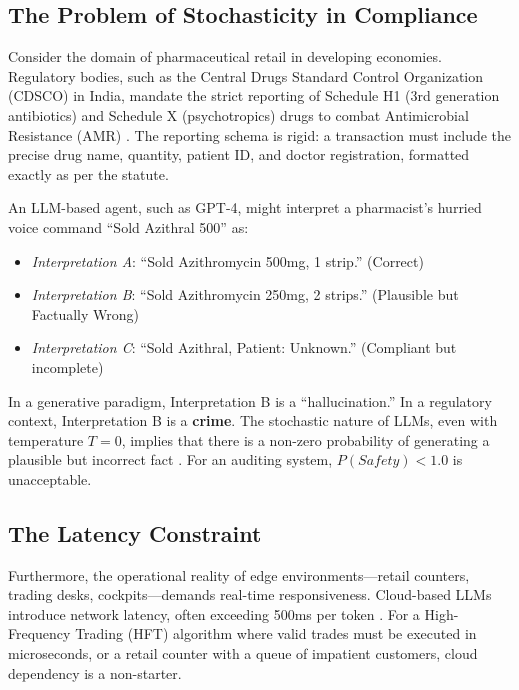 \documentclass[11pt]{article}
\begin{document}
\subsection{The Problem of Stochasticity in Compliance}
Consider the domain of pharmaceutical retail in developing economies. Regulatory bodies, such as the Central Drugs Standard Control Organization (CDSCO) in India, mandate the strict reporting of Schedule H1 (3rd generation antibiotics) and Schedule X (psychotropics) drugs to combat Antimicrobial Resistance (AMR) \cite{who2021}. The reporting schema is rigid: a transaction must include the precise drug name, quantity, patient ID, and doctor registration, formatted exactly as per the statute.

An LLM-based agent, such as GPT-4, might interpret a pharmacist's hurried voice command ``Sold Azithral 500'' as:
\begin{itemize}
    \item \textit{Interpretation A}: ``Sold Azithromycin 500mg, 1 strip.'' (Correct)
    \item \textit{Interpretation B}: ``Sold Azithromycin 250mg, 2 strips.'' (Plausible but Factually Wrong)
    \item \textit{Interpretation C}: ``Sold Azithral, Patient: Unknown.'' (Compliant but incomplete)
\end{itemize}
In a generative paradigm, Interpretation B is a ``hallucination.'' In a regulatory context, Interpretation B is a \textbf{crime}. The stochastic nature of LLMs, even with temperature $T=0$, implies that there is a non-zero probability of generating a plausible but incorrect fact \cite{bender2021}. For an auditing system, $P(Safety) < 1.0$ is unacceptable.

\subsection{The Latency Constraint}
Furthermore, the operational reality of edge environments---retail counters, trading desks, cockpits---demands real-time responsiveness. Cloud-based LLMs introduce network latency, often exceeding 500ms per token \cite{zhang2021}. For a High-Frequency Trading (HFT) algorithm where valid trades must be executed in microseconds, or a retail counter with a queue of impatient customers, cloud dependency is a non-starter.
\end{document}
